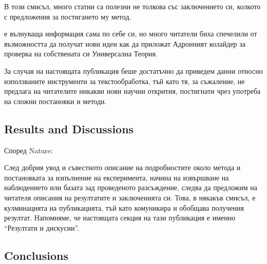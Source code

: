 \documentclass[11pt, oneside]{article}     %
\begin{document}
В този смисъл, много статии са полезни не толкова със заключението си, колкото с предложения за постигането му метод. \\

   е вълнуваща информация сама по себе си, но много читатели биха спечелили от възможността да получат нови идеи как да приложат Адронният колайдер за проверка на собствената си Универсална Теория.

   За случая на настоящата публикация беше достатъчно да приведем данни относно използваните инструменти за текстообработка, тъй като тя, за съжаление, не предлага на читателите никакви нови научни открития, постигнати чрез употреба на сложни постановки и методи. \\

\subsection*{Results and Discussions}

Според Nature:\\

След добрия увод и съвестното описание на подробностите около метода и постановката за изпълнение на експеримента, начина на извършване на наблюдението или базата зад проведеното разсъждение, следва да предложим на читателя описания на резултатите и заключенията си. Това, в някакъв смисъл, е кулминацията на публикацията, тъй като комуникира и обобщава получения резултат. Напомняме, че настоящата секция на тази публикация е именно ``Резултати и дискусии''.


\subsection*{Conclusions}
\end{document}
